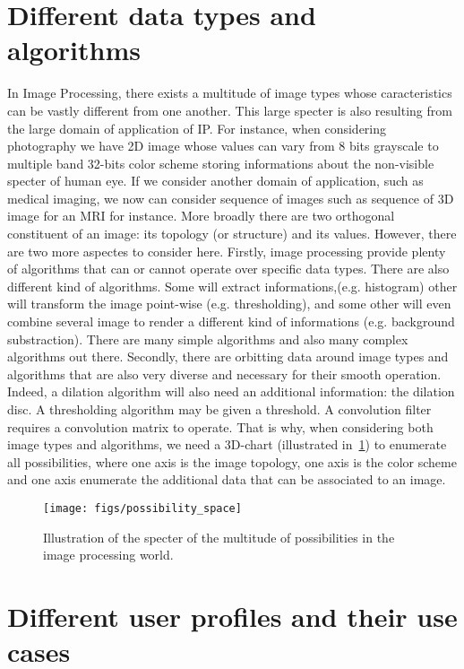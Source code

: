 \section*{Different data types and algorithms}

In Image Processing, there exists a multitude of image types whose caracteristics can be vastly different from one
another. This large specter is also resulting from the large domain of application of IP. For instance, when considering
photography we have 2D image whose values can vary from 8 bits grayscale to multiple band 32-bits color scheme storing
informations about the non-visible specter of human eye. If we consider another domain of application, such as medical
imaging, we now can consider sequence of images such as sequence of 3D image for an MRI for instance. More broadly there
are two orthogonal constituent of an image: its topology (or structure) and its values. However, there are two more
aspectes to consider here. Firstly, image processing provide plenty of algorithms that can or cannot operate over
specific data types. There are also different kind of algorithms. Some will extract informations,(e.g. histogram) other
will transform the image point-wise (e.g. thresholding), and some other will even combine several image to render a
different kind of informations (e.g. background substraction). There are many simple algorithms and also many complex
algorithms out there. Secondly, there are orbitting data around image types and algorithms that are also very diverse
and necessary for their smooth operation. Indeed, a dilation algorithm will also need an additional information: the
dilation disc. A thresholding algorithm may be given a threshold. A convolution filter requires a convolution matrix to
operate. That is why, when considering both image types and algorithms, we need a 3D-chart (illustrated
in~\cref{fig.int.possibility_space}) to enumerate all possibilities, where one axis is the image topology, one axis is
the color scheme and one axis enumerate the additional data that can be associated to an image.


\begin{figure}[tbh]
  \centering
  \texttt{[image: figs/possibility\_space]}
  \caption{Illustration of the specter of the multitude of possibilities in the image processing world.}
  \label{fig.int.possibility_space}
\end{figure}


\section*{Different user profiles and their use cases}

